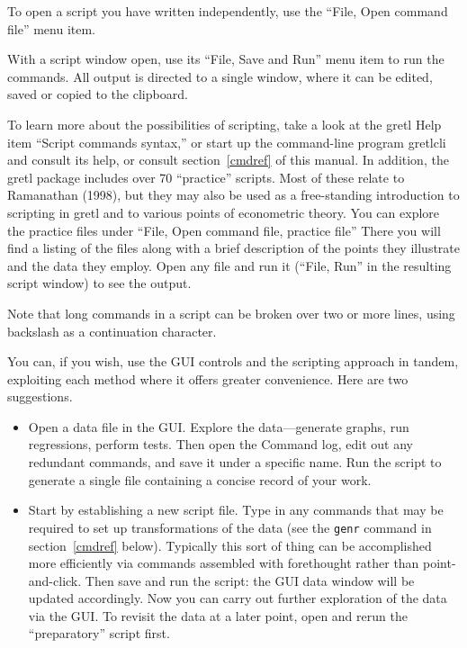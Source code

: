 \documentclass{article}
\begin{document}
To open a script you have written independently, use the ``File, Open
command file'' menu item.

With a script window open, use its ``File, Save and Run'' menu item to
run the commands.  All output is directed to a single window, where it
can be edited, saved or copied to the clipboard.

To learn more about the possibilities of scripting, take a look at the
\textsf{gretl} Help item ``Script commands syntax,'' or start up the
command-line program \textsf{gretlcli} and consult its help, or
consult section~\ref{cmdref} of this manual.  In addition, the
\textsf{gretl} package includes over 70 ``practice'' scripts.  Most of
these relate to Ramanathan (1998), but they may also be used as a
free-standing introduction to scripting in \textsf{gretl} and to
various points of econometric theory.  You can explore the practice
files under ``File, Open command file, practice file''  There you
will find a listing of the files along with a brief description of the
points they illustrate and the data they employ.  Open any file and
run it (``File, Run'' in the resulting script window) to see the
output.

Note that long commands in a script can be broken over two or more
lines, using backslash as a continuation character.

You can, if you wish, use the GUI controls and the scripting
approach in tandem, exploiting each method where it offers greater
convenience.  Here are two suggestions.

\begin{itemize}
\item Open a data file in the GUI.  Explore the data---generate
  graphs, run regressions, perform tests.  Then open the Command log,
  edit out any redundant commands, and save it under a specific name.
  Run the script to generate a single file containing a concise record
  of your work.
\item Start by establishing a new script file.  Type in any commands
  that may be required to set up transformations of the data (see the
  \texttt{genr} command in section~\ref{cmdref} below).  Typically
  this sort of thing can be accomplished more efficiently via commands
  assembled with forethought rather than point-and-click.  Then save
  and run the script: the GUI data window will be updated accordingly.
  Now you can carry out further exploration of the data via the GUI.
  To revisit the data at a later point, open and rerun the
  ``preparatory'' script first.
\end{itemize}
\end{document}
